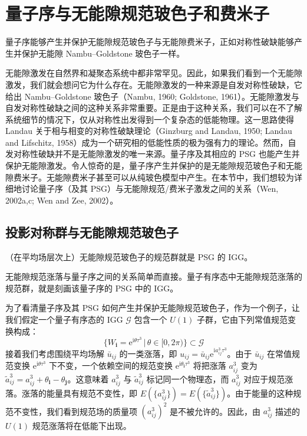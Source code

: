 \section{量子序与无能隙规范玻色子和费米子}

\begin{keypoints}
\item 量子序能够产生并保护无能隙规范玻色子与无能隙费米子，正如对称性破缺能够产生并保护无能隙 Nambu--Goldstone 玻色子一样。
\end{keypoints}

无能隙激发在自然界和凝聚态系统中都非常罕见。因此，如果我们看到一个无能隙激发，我们就会想问它为什么存在。无能隙激发的一种来源是自发对称性破缺，它给出 Nambu--Goldstone 玻色子（Nambu, 1960; Goldstone, 1961）。无能隙激发与自发对称性破缺之间的这种关系非常重要。正是由于这种关系，我们可以在不了解系统细节的情况下，仅从对称性出发得到一个复杂态的低能物理。这一思路使得 Landau 关于相与相变的对称性破缺理论（Ginzburg and Landau, 1950; Landau and Lifschitz, 1958）成为一个研究相的低能性质的极为强有力的理论。然而，自发对称性破缺并不是无能隙激发的唯一来源。量子序及其相应的 PSG 也能产生并保护无能隙激发。令人惊奇的是，量子序产生并保护的是无能隙规范玻色子和无能隙费米子。无能隙费米子甚至可以从纯玻色模型中产生。在本节中，我们想较为详细地讨论量子序（及其 PSG）与无能隙规范/费米子激发之间的关系（Wen, 2002a,c; Wen and Zee, 2002）。

\subsection{投影对称群与无能隙规范玻色子}

\begin{keypoints}
\item （在平均场层次上）无能隙规范玻色子的规范群就是 PSG 的 IGG。
\end{keypoints}

无能隙规范涨落与量子序之间的关系简单而直接。量子有序态中无能隙规范涨落的规范群，就是刻画该量子序的 PSG 中的 IGG。

为了看清量子序及其 PSG 如何产生并保护无能隙规范玻色子，作为一个例子，让我们假定一个量子有序态的 IGG $\mathcal{G}$ 包含一个 $U(1)$ 子群，它由下列常值规范变换构成：
\begin{equation*}
\{W_{\pmb{i}}=\mathrm{e}^{\mathrm{i}\theta\tau^{3}}\,|\,\theta\in[0,2\pi)\}\subset\mathcal{G}
\end{equation*}
接着我们考虑围绕平均场解 $\bar{u}_{ij}$ 的一类涨落，即 $u_{ij}=\bar{u}_{ij}\mathrm{e}^{\mathrm{i}a_{ij}^{3}\tau^{3}}$。由于 $\bar{u}_{ij}$ 在常值规范变换 $\mathrm{e}^{\mathrm{i}\theta\tau^{3}}$ 下不变，一个依赖空间的规范变换 $\mathrm{e}^{\mathrm{i}\theta_{\pmb{i}}\tau^{3}}$ 将把涨落 $a_{ij}^{3}$ 变为 $\tilde{a}_{ij}^{3}=a_{ij}^{3}+\theta_{\pmb{i}}-\theta_{\pmb{j}}$。这意味着 $a_{ij}^{3}$ 与 $\tilde{a}_{ij}^{3}$ 标记同一个物理态，而 $a_{ij}^{3}$ 对应于规范涨落。涨落的能量具有规范不变性，即 $E(\{a_{ij}^{3}\})=E(\{\tilde{a}_{ij}^{3}\})$。由于能量的这种规范不变性，我们看到规范场的质量项 $(a_{ij}^{3})^{2}$ 是不被允许的。因此，由 $a_{ij}^{3}$ 描述的 $U(1)$ 规范涨落将在低能下出现。

